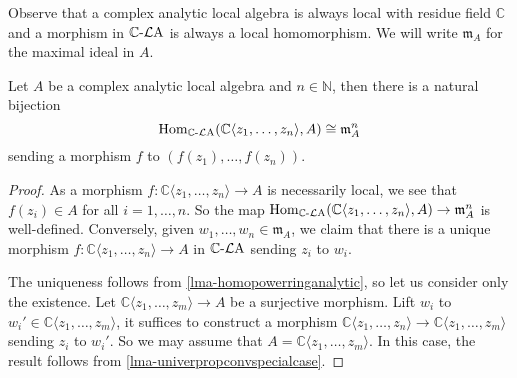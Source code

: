 Observe that a complex analytic local algebra is always local with residue field $\mathbb{C}$ and a morphism in $\mathbb{C}\text{-}\mathcal{L}\mathrm{A}$ is always a local homomorphism. We will write $\mathfrak{m}_A$ for the maximal ideal in $A$.

\begin{lemma}\label{lma-powerseriesfunctorpoint}
    Let $A$ be a complex analytic local algebra and $n\in \mathbb{N}$, then there is a natural bijection
    \[
        \operatorname{Hom}_{\mathbb{C}\text{-}\mathcal{L}\mathrm{A}}(\mathbb{C}\langle z_1,\ldots,z_n \rangle,A)\cong \mathfrak{m}_{A}^n
    \]
    sending a morphism $f$ to $(f(z_1),\ldots,f(z_n))$.
\end{lemma}
\begin{proof}
    As a morphism $f:\mathbb{C}\langle z_1,\ldots,z_n \rangle \rightarrow A$ is necessarily local, we see that $f(z_i)\in A$ for all $i=1,\ldots,n$. So the map $\operatorname{Hom}_{\mathbb{C}\text{-}\mathcal{L}\mathrm{A}}(\mathbb{C}\langle z_1,\ldots,z_n \rangle,A)\rightarrow \mathfrak{m}_{A}^n$ is well-defined. Conversely, given $w_1,\ldots,w_n\in \mathfrak{m}_A$, we claim that there is a unique morphism $f:\mathbb{C}\langle z_1,\ldots,z_n \rangle \rightarrow A$ in $\mathbb{C}\text{-}\mathcal{L}\mathrm{A}$ sending $z_i$ to $w_i$.

    The uniqueness follows from \cref{lma-homopowerringanalytic}, so let us consider only the existence.
    Let $\mathbb{C}\langle z_1,\ldots,z_m \rangle \rightarrow A$ be a surjective morphism. Lift $w_i$ to $w_i'\in \mathbb{C}\langle z_1,\ldots,z_m \rangle$, it suffices to construct a morphism $\mathbb{C}\langle z_1,\ldots,z_n \rangle\rightarrow \mathbb{C}\langle z_1,\ldots,z_m \rangle$ sending $z_i$ to $w_i'$. So we may assume that $A=\mathbb{C}\langle z_1,\ldots,z_m \rangle$. In this case, the result follows from \cref{lma-univerpropconvspecialcase}.
\end{proof}

